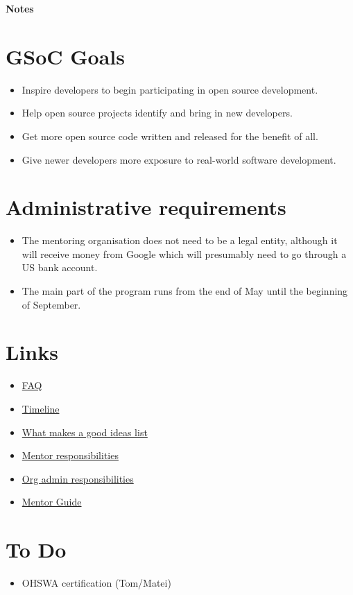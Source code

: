 \documentclass{article}
\begin{document}
\newpage
\appendix 
\LARGE \textbf{Notes} \normalsize

\section{GSoC Goals}

{\itshape
\begin{itemize}
\item Inspire developers to begin participating in open source development.
\item Help open source projects identify and bring in new developers.
\item Get more open source code written and released for the benefit of all.
\item Give newer developers more exposure to real-world software development.
\end{itemize}
}


\section{Administrative requirements}

{\itshape 
\begin{itemize}
\item The mentoring organisation does not need to be a legal entity, although it will receive money from Google which will presumably need to go through a US bank account.
\item The main part of the program runs from the end of May until the beginning of September.
\end{itemize}
}


\section{Links}

\begin{itemize}\item \href{https://developers.google.com/open-source/gsoc/faq}{FAQ}
\item \href{https://developers.google.com/open-source/gsoc/timeline}{Timeline}
\item \href{https://google.github.io/gsocguides/mentor/defining-a-project-ideas-list.html}{What makes a good ideas list}
\item \href{https://developers.google.com/open-source/gsoc/help/responsibilities#mentor_responsibilities}{Mentor responsibilities}
\item \href{https://developers.google.com/open-source/gsoc/help/responsibilities#org_admin_responsibilities}{Org admin responsibilities}
\item \href{https://google.github.io/gsocguides/mentor/}{Mentor Guide}
\end{itemize}


\section{To Do}

{\itshape 
\begin{itemize}
\item OHSWA certification (Tom/Matei)
\end{itemize}
}
\end{document}
